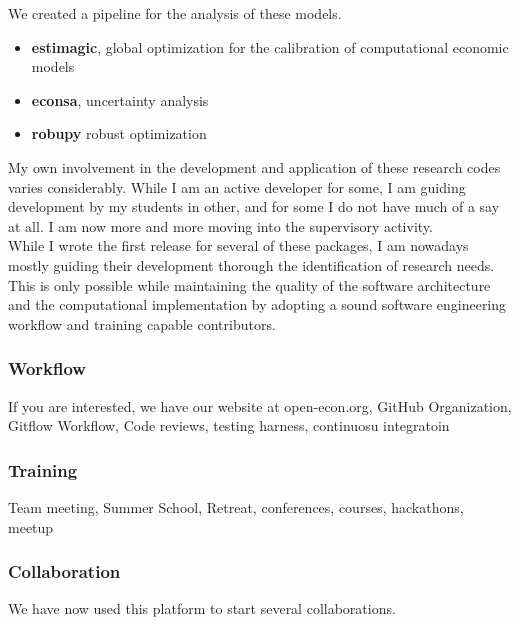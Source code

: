 We created a pipeline for the analysis of these models.

\begin{itemize}
\item \textbf{estimagic}, global optimization for the calibration of computational economic models
\item \textbf{econsa}, uncertainty analysis
\item \textbf{robupy} robust optimization
\end{itemize}

\noindent My own involvement in the development and application of these research codes varies considerably. While I am an active developer for some, I am guiding development by my students in other, and for some I do not have much of a say at all. I am now more and more moving into the supervisory activity.\\

\noindent While I wrote the first release for several of these packages, I am nowadays mostly guiding their development thorough the identification of research needs. This is only possible while maintaining the quality of the software architecture and the computational implementation by adopting a sound software engineering workflow and training capable contributors.

\subsubsection*{Workflow}


If you are interested, we have our website at open-econ.org, GitHub Organization, Gitflow Workflow, Code reviews, testing harness, continuosu integratoin

\subsubsection*{Training} Team meeting, Summer School, Retreat, conferences, courses, hackathons, meetup




\subsubsection*{Collaboration}
We have now used this platform to start several collaborations.
